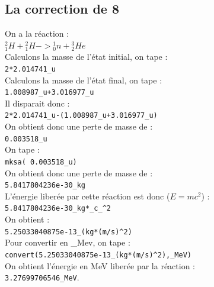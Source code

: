 \documentclass[a4paper,11pt]{book}
\begin{document}
\subsection{La correction de 8}
On a la r\'eaction :\\
${}_1^2H+{}_1^2H->{}_0^1n+{}_2^3He$\\
Calculons la masse de l'\'etat initial, on tape :\\
{\tt 2*2.014741\_u}\\
Calculons la masse de l'\'etat final, on tape :\\
{\tt 1.008987\_u+3.016977\_u}\\
Il disparait donc :\\
{\tt 2*2.014741\_u-(1.008987\_u+3.016977\_u)}\\
On obtient donc une perte de masse de :\\
{\tt 0.003518\_u}\\
On tape :\\
{\tt mksa( 0.003518\_u)}\\
On obtient donc une perte de masse de :\\
{\tt 5.8417804236e-30\_kg}\\
L'\'energie liber\'ee par cette r\'eaction est donc ($E=mc^2$) :\\
{\tt 5.8417804236e-30\_kg*\_c\_\verb|^|2} \\
On obtient :\\
{\tt 5.25033040875e-13\_(kg*(m/s)\verb|^|2)}\\
Pour convertir en \_Mev, on tape :\\
{\tt convert(5.25033040875e-13\_(kg*(m/s)\verb|^|2),\_MeV)} \\
On obtient l'\'energie en MeV liber\'ee par la r\'eaction :\\
{\tt 3.27699706546\_MeV}.

\newpage

\tableofcontents
\end{document}
